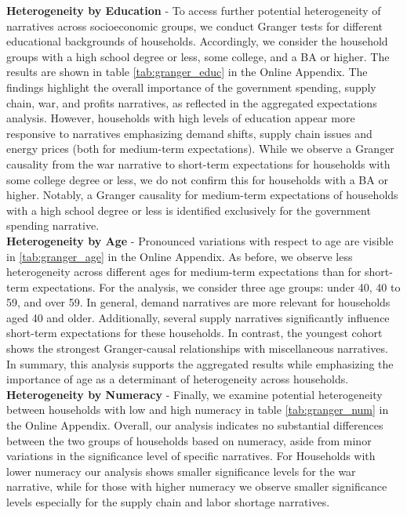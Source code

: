 \noindent \textbf{Heterogeneity by Education} - To access further potential heterogeneity of narratives across socioeconomic groups, we conduct Granger tests for different educational backgrounds of households. Accordingly, we consider the household groups with a high school degree or less, some college, and a BA or higher. The results are shown in table \ref{tab:granger_educ} in the Online Appendix. The findings highlight the overall importance of the government spending, supply chain, war, and profits narratives, as reflected in the aggregated expectations analysis.  However, households with high levels of education appear more responsive to narratives emphasizing demand shifts, supply chain issues and energy prices (both for medium-term expectations). While we observe a Granger causality from the war narrative to short-term expectations for households with some college degree or less, we do not confirm this for households with a BA or higher. Notably, a Granger causality for medium-term expectations of households with a high school degree or less is identified exclusively for the government spending narrative.\\

\noindent \textbf{Heterogeneity by Age} - Pronounced variations with respect to age are visible in \ref{tab:granger_age} in the Online Appendix. As before, we observe less heterogeneity across different ages for medium-term expectations than for short-term expectations. For the analysis, we consider three age groups: under 40, 40 to 59, and over 59. In general, demand narratives are more relevant for households aged 40 and older. Additionally, several supply narratives significantly influence short-term expectations for these households. In contrast, the youngest cohort shows the strongest Granger-causal relationships with miscellaneous narratives. In summary, this analysis supports the aggregated results while emphasizing the importance of age as a determinant of heterogeneity across households. \\

\noindent\textbf{Heterogeneity by Numeracy} - Finally, we examine potential heterogeneity between households with low and high numeracy in table \ref{tab:granger_num} in the Online Appendix. Overall, our analysis indicates no substantial differences between the two groups of households based on numeracy, aside from minor variations in the significance level of specific narratives. For Households with lower numeracy our analysis shows smaller significance levels for the war narrative, while for those with higher numeracy we observe smaller significance levels especially for the supply chain and labor shortage narratives.

